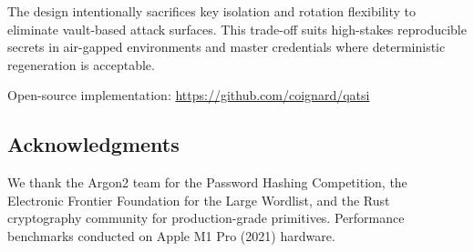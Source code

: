 \documentclass[11pt]{article}
\begin{document}
The design intentionally sacrifices key isolation and rotation flexibility to eliminate vault-based attack surfaces. This trade-off suits high-stakes reproducible secrets in air-gapped environments and master credentials where deterministic regeneration is acceptable.

Open-source implementation: \url{https://github.com/coignard/qatsi}

\subsection*{Acknowledgments}

We thank the Argon2 team for the Password Hashing Competition, the Electronic Frontier Foundation for the Large Wordlist, and the Rust cryptography community for production-grade primitives. Performance benchmarks conducted on Apple M1 Pro (2021) hardware.
\end{document}
